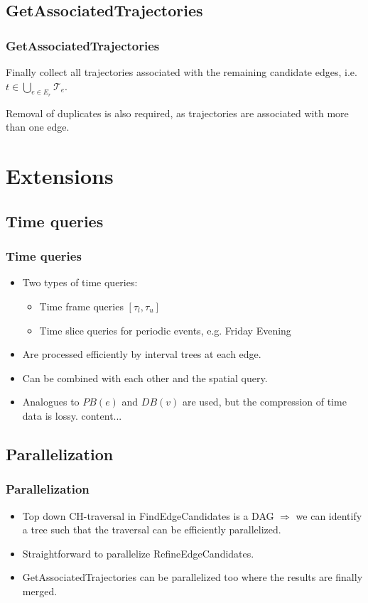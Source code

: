 \documentclass{beamer}
\newcommand{\findEdgeCandidates}{FindEdgeCandidates\xspace}
\newcommand{\refineEdgeCandidates}{RefineEdgeCandidates\xspace}
\newcommand{\getAssociatedTrajectories}{GetAssociatedTrajectories\xspace}
\begin{document}
\subsection{\getAssociatedTrajectories}
\begin{frame}
	\frametitle{\getAssociatedTrajectories}
	Finally collect all trajectories associated with the remaining candidate edges, i.e. $t \in \bigcup_{e \in E_r} \mathcal{T}_e $.\pause

	Removal of duplicates is also required, as trajectories are associated with more than one edge.
\end{frame}

\section{Extensions}

\subsection{Time queries}
\begin{frame}
	\frametitle{Time queries}
	\begin{itemize}

		\item	Two types of time queries: \pause
		      \begin{itemize}
			      \item Time frame queries $[\tau_l, \tau_u]$ \pause
			      \item Time slice queries for periodic events, e.g. Friday Evening \pause
		      \end{itemize}
		\item	Are processed efficiently by interval trees at each edge. \pause

		\item Can be combined with each other and the spatial query. \pause

		\item	Analogues to $PB(e)$ and $DB(v)$ are used, but the compression of time data is lossy.
		      content...
	\end{itemize}
\end{frame}

\subsection{Parallelization}
\begin{frame}
	\frametitle{Parallelization}
	\begin{itemize}
		\item<1-> Top down CH-traversal in \findEdgeCandidates is a DAG \pause $\Rightarrow$ we can identify a tree such that the traversal can be efficiently parallelized.
		\item<2-> Straightforward to parallelize \refineEdgeCandidates.
		\item<3-> \getAssociatedTrajectories can be parallelized too where the results are finally merged.
	\end{itemize}
\end{frame}
\end{document}
